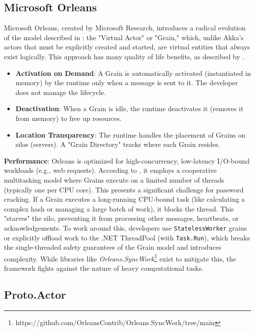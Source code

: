\subsection{Microsoft Orleans}

Microsoft Orleans, created by Microsoft Research, introduces a radical evolution of the model described in \cite{orleans_overview}: the "Virtual Actor" or "Grain," which, unlike Akka's actors that must be explicitly created and started, are virtual entities that always exist logically. This approach has many quality of life benefits, as described by \cite{orleans_benefits}.

\begin{itemize}
    \item \textbf{Activation on Demand}: A Grain is automatically activated (instantiated in memory) by the runtime only when a message is sent to it. The developer does not manage the lifecycle.

    \item \textbf{Deactivation}: When a Grain is idle, the runtime deactivates it (removes it from memory) to free up resources.

    \item \textbf{Location Transparency}: The runtime handles the placement of Grains on silos (servers). A "Grain Directory" tracks where each Grain resides.
\end{itemize}

\textbf{Performance}: Orleans is optimized for high-concurrency, low-latency I/O-bound workloads (e.g., web requests). According to \cite{orleans_perf}, it employs a cooperative multitasking model where Grains execute on a limited number of threads (typically one per CPU core). This presents a significant challenge for password cracking. If a Grain executes a long-running CPU-bound task (like calculating a complex hash or managing a large batch of work), it blocks the thread. This "starves" the silo, preventing it from processing other messages, heartbeats, or acknowledgements. To work around this, developers use \verb|StatelessWorker| grains or explicitly offload work to the .NET ThreadPool (with \verb|Task.Run|), which breaks the single-threaded safety guarantees of the Grain model and introduces complexity.
While libraries like \textit{Orleans.SyncWork}\footnote{https://github.com/OrleansContrib/Orleans.SyncWork/tree/main} exist to mitigate this, the framework fights against the nature of heavy computational tasks.

\subsection{Proto.Actor}

